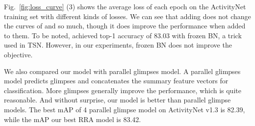 \documentclass[runningheads]{llncs}
\begin{document}
Fig.~\ref{fig:loss_curve} (3) shows the average loss of each epoch on the ActivityNet training set with different kinds of losses. We can see that adding  does not change the curves of  and  so much, though it does improve the performance when added to them. To be noted,  achieved top-1 accuracy of 83.03 with frozen BN, a trick used in TSN. However, in our experiments, frozen BN does not improve the  objective.

We also compared our model with parallel glimpses model. A  parallel glimpses model predicts  glimpses and concatenates the summary feature vectors for classification. More glimpses generally improve the performance, which is quite reasonable. And without surprise, our model is better than parallel glimpse models. The best mAP of 4 parallel glimpse model on ActivityNet v1.3 is 82.39, while the mAP our best RRA model is 83.42.



\begin{table}[htbp]
  \centering
{}
\caption{Ablation mAPs on the ActivityNet v1.3 validation set, with ResNet-152. \emph{Left}: changing number of glimpses from 1 to 5. \emph{Right}: modifying RRA module into: 1.spatio-temporal average pooling instead of attention; 2.spatial attention and temporal average pooling; 3.no BN; 4.no ReLU; 5.no tanh; 6.-ReLU(x) instead of tanh(x). All the settings are the same as the 83.42 mAP model except for the specified variations.}
  \label{tab:ablation}
\end{table}
\end{document}
